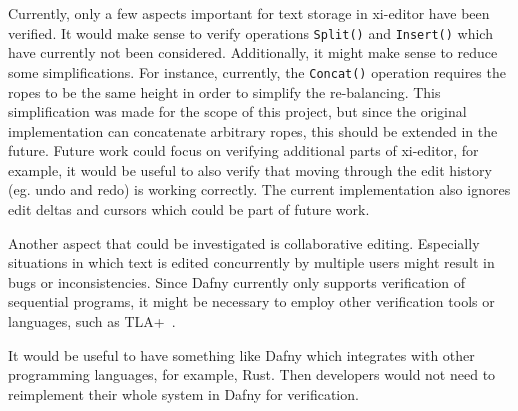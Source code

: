 Currently, only a few aspects important for text storage in xi-editor have been verified.
It would make sense to verify operations \texttt{Split()} and \texttt{Insert()} which have currently not been considered.
Additionally, it might make sense to reduce some simplifications.
For instance, currently, the \texttt{Concat()} operation requires the ropes to be the same height in order to simplify the re-balancing. 
This simplification was made for the scope of this project, but since the original implementation can concatenate arbitrary ropes, this should be extended in the future.
Future work could focus on verifying additional parts of xi-editor, for example, it would be useful to also verify that moving through the edit history (eg. undo and redo) is working correctly.
The current implementation also ignores edit deltas and cursors which could be part of future work.

Another aspect that could be investigated is collaborative editing.
Especially situations in which text is edited concurrently by multiple users might result in bugs or inconsistencies.
Since Dafny currently only supports verification of sequential programs, it might be necessary to employ other verification tools or languages, such as TLA+~\cite{chaudhuri2010verifying}.

It would be useful to have something like Dafny which integrates with other programming languages, for example, Rust.
Then developers would not need to reimplement their whole system in Dafny for verification.
